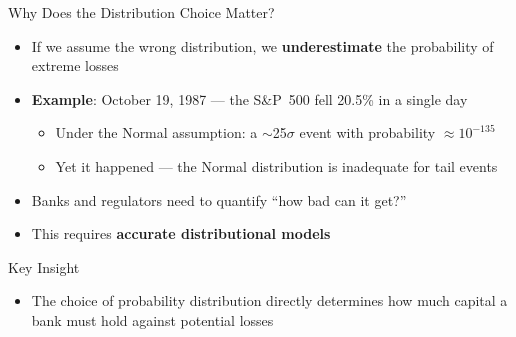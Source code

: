 \documentclass[9pt, aspectratio=169, t]{beamer}
\theoremstyle{definition}
\begin{document}
\begin{frame}{Why Does the Distribution Choice Matter?}
\begin{itemize}
\item If we assume the wrong distribution, we \textbf{underestimate} the probability of extreme losses
\item \textbf{Example}: October 19, 1987 --- the S\&P~500 fell 20.5\% in a single day
\begin{itemize}
\item Under the Normal assumption: a $\sim$25$\sigma$ event with probability $\approx 10^{-135}$
\item Yet it happened --- the Normal distribution is inadequate for tail events
\end{itemize}
\item Banks and regulators need to quantify ``how bad can it get?''
\item This requires \textbf{accurate distributional models}
\end{itemize}

\vspace{0.3cm}
\begin{alertblock}{Key Insight}
\begin{itemize}
\item The choice of probability distribution directly determines how much capital a bank must hold against potential losses
\end{itemize}
\end{alertblock}
\end{frame}
\end{document}
